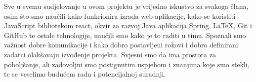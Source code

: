           Sve u svemu sudjelovanje u ovom projektu je vrijedno iskustvo za svakoga člana, osim što smo naučili kako funkcionira izrada web aplikacije, kako se koristiti JavaScript bibliotekom react, okvir za razvoj Java aplikacija Spring, LaTeX, Git i GitHub te ostale tehnologije, naučili smo kako je to raditi u timu.  Spoznali smo važnost dobre komunikacije i kako dobro postavljeni rokovi i dobro definirani zadatci olakšavaju izvođenje projekta. Svjesni smo da ima prostora za poboljšanje, ali zadovoljni smo postignutim uspjehom i znanjima koje smo stekli, te se veselimo budućem radu i potencijalnoj suradnji.
		
		\eject 
